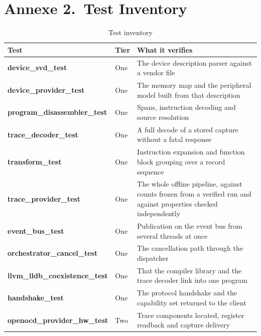 \newpage
\section*{Annexe 2.~Test Inventory}

\begin{table}[H]
    \centering
    \caption{Test inventory}
    \label{tab:tests}
    \begin{tabularx}{\linewidth}{| @{}>{\hsize\bfseries\ttfamily\scriptsize}Y | >{\hsize}Y | >{\hsize}Y@{} |}
        \hline
        \rmfamily\normalsize Test & \textbf{Tier} & \textbf{What it verifies} \\
        \hline
        device\_svd\_test & \rmfamily One & The device description parser against a vendor file \\
        \hline
        device\_provider\_test & \rmfamily One & The memory map and the peripheral model built from that description \\
        \hline
        program\_disassembler\_test & \rmfamily One & Spans, instruction decoding and source resolution \\
        \hline
        trace\_decoder\_test & \rmfamily One & A full decode of a stored capture without a fatal response \\
        \hline
        transform\_test & \rmfamily One & Instruction expansion and function block grouping over a record sequence \\
        \hline
        trace\_provider\_test & \rmfamily One & The whole offline pipeline, against counts frozen from a verified run and against properties checked independently \\
        \hline
        event\_bus\_test & \rmfamily One & Publication on the event bus from several threads at once \\
        \hline
        orchestrator\_cancel\_test & \rmfamily One & The cancellation path through the dispatcher \\
        \hline
        llvm\_lldb\_coexistence\_test & \rmfamily One & That the compiler library and the trace decoder link into one program \\
        \hline
        handshake\_test & \rmfamily One & The protocol handshake and the capability set returned to the client \\
        \hline
        openocd\_provider\_hw\_test & \rmfamily Two & Trace components located, register readback and capture delivery \\

\end{tabularx}
\end{table}
